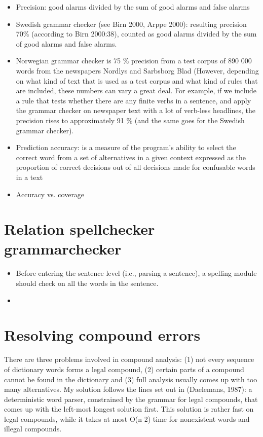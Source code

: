 \documentclass[a4paper,english,12pt]{article}
\begin{document}
\begin{spacing}{1.0}
\begin{itemize}
\item Precision: good alarms divided by the sum of good alarms and false alarms
\item Swedish grammar checker (see Birn 2000, Arppe 2000): resulting precision 70\% (according to Birn 2000:38), counted as good alarms divided by the sum of good alarms and false alarms. 
\item Norwegian grammar checker is 75 \% precision from a test corpus of 890 000 words from the newspapers Nordlys and Sarbsborg Blad \cite{Hagen2001a} (However, depending on what kind of text that is used as a test corpus and what kind of rules that are included, these numbers can vary a great deal. For example, if we include a rule that tests whether there are any finite verbs in a sentence, and apply the grammar checker on newspaper text with a lot of verb-less headlines, the precision rises to approximately 91 \% (and the same goes for the Swedish grammar checker).
\item Prediction accuracy: is a measure of the program's ability to select the correct word from a set of alternatives in a given context expressed as the proportion of correct decisions out of all decisions made for confusable words in a text \cite{Pedler2007} 
\item Accuracy vs. coverage \cite[p.186]{Pedler2007}
\end{itemize}

\section{Relation spellchecker grammarchecker}

\begin{itemize}
\item Before entering the sentence level (i.e., parsing a sentence), a spelling module should check on all the words in the sentence. \cite{Vosse1992}
\item
\end{itemize}

\section{Resolving compound errors}

There are three problems involved
in compound analysis: (1) not every sequence of dictionary
words forms a legal compound, (2) certain
parts of a compound cannot be found in the dictionary
and (3) full analysis usually comes up with
too many alternatives. My solution follows the lines
set out in (Daelemans, 1987): a deterministic word
parser, constrained by the grammar for legal compounds,
that comes up with the left-most longest
solution first. This solution is rather fast on legal
compounds, while it takes at most O(n 2) time for
nonexistent words and illegal compounds. \cite{Vosse1992}


\end{spacing}
\end{document}
